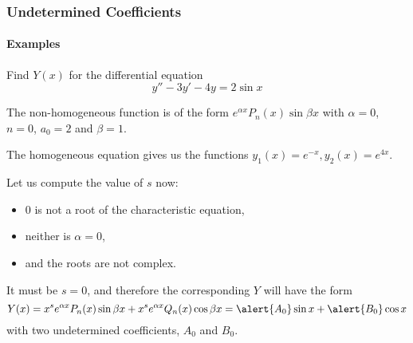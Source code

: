 \documentclass[9pt,xcolor=x11names,compress]{beamer}
\begin{document}
\begin{frame}\frametitle{Undetermined Coefficients}
\framesubtitle{Examples}
\begin{block}
	{Find $Y(x)$ for the differential equation}
	\begin{equation*}
	y''-3y'-4y=2\sin x	
	\end{equation*}
\end{block}
\pause The non-homogeneous function is of the form $e^{\alpha x}P_n(x)\sin \beta x$ with $\alpha=0$, $n=0$, $a_0=2$ and $\beta=1$. 

\pause The homogeneous equation gives us the functions $y_1(x)=e^{-x}, y_2(x)=e^{4x}$.  

\pause Let us compute the value of $s$ now:
\begin{itemize}
	\item 0 is not a root of the characteristic equation, 
	\item neither is $\alpha=0$,
	\item and the roots are not complex.
\end{itemize}
\pause It must be $s=0$, and therefore the corresponding $Y$ will have the form
\begin{equation*}
	Y(x)=x^se^{\alpha x}P_n(x) \sin \beta x+ x^s e^{\alpha x}Q_n(x)\cos \beta x = \alert{A_0}\sin x + \alert{B_0}\cos x
\end{equation*}
with two \alert{undetermined coefficients, $A_0$ and $B_0$.}
\end{frame}
\end{document}
